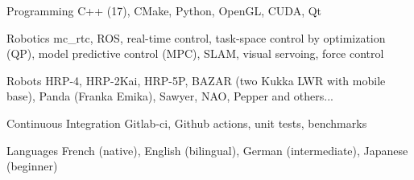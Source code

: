 
\begin{cvskills}

  \cvskill
  {Programming} %
  {C++ (17), CMake, Python, OpenGL, CUDA, Qt} %

  \cvskill
  {Robotics} %
  {mc\_rtc, ROS, real-time control, task-space control by optimization (QP), model predictive control (MPC),
  SLAM, visual servoing, force control} %

  \cvskill
  {Robots} %
  {HRP-4, HRP-2Kai, HRP-5P, BAZAR (two Kukka LWR with mobile base), Panda (Franka Emika), Sawyer, NAO, Pepper
  and others...} %

  \cvskill
  {Continuous Integration} %
  {Gitlab-ci, Github actions, unit tests, benchmarks} %

  \cvskill
  {Languages} %
  {French (native), English (bilingual), German (intermediate), Japanese (beginner)} %

\end{cvskills}
